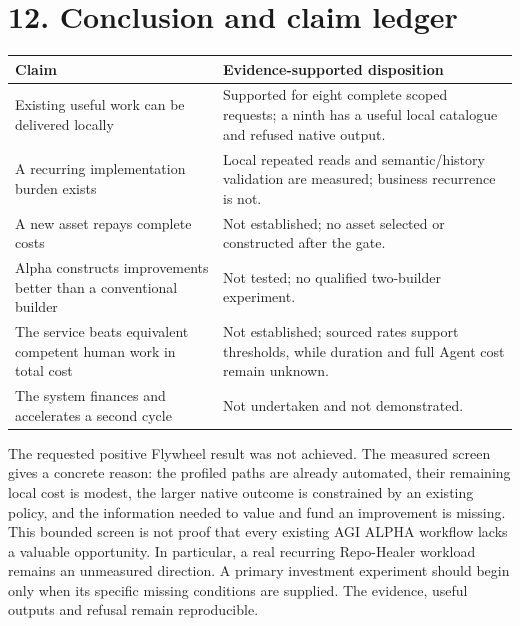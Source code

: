 \documentclass[11pt,letterpaper]{article}
\newcommand{\sect}[1]{\section*{#1}}
\begin{document}
\sect{12. Conclusion and claim ledger}
\begin{tabularx}{\linewidth}{@{}p{.44\linewidth}Y@{}}
\toprule
\textbf{Claim} & \textbf{Evidence-supported disposition}\\
\midrule
Existing useful work can be delivered locally & Supported for eight complete scoped requests; a ninth has a useful local catalogue and refused native output.\\
A recurring implementation burden exists & Local repeated reads and semantic/history validation are measured; business recurrence is not.\\
A new asset repays complete costs & Not established; no asset selected or constructed after the gate.\\
Alpha constructs improvements better than a conventional builder & Not tested; no qualified two-builder experiment.\\
The service beats equivalent competent human work in total cost & Not established; sourced rates support thresholds, while duration and full Agent cost remain unknown.\\
The system finances and accelerates a second cycle & Not undertaken and not demonstrated.\\
\bottomrule
\end{tabularx}

The requested positive Flywheel result was not achieved. The measured screen gives a concrete reason: the profiled paths are already automated, their remaining local cost is modest, the larger native outcome is constrained by an existing policy, and the information needed to value and fund an improvement is missing. This bounded screen is not proof that every existing AGI ALPHA workflow lacks a valuable opportunity. In particular, a real recurring Repo-Healer workload remains an unmeasured direction. A primary investment experiment should begin only when its specific missing conditions are supplied. The evidence, useful outputs and refusal remain reproducible.
\end{document}
